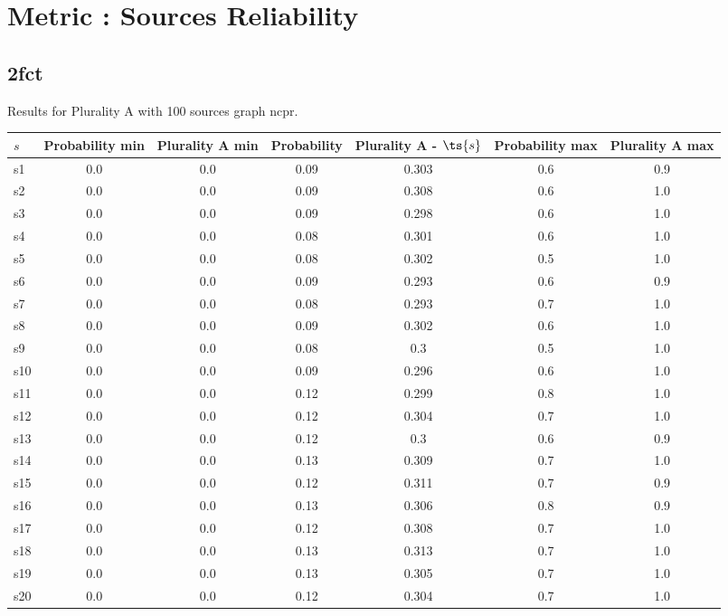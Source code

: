 \documentclass{article}
\begin{document}
\section{Metric : Sources Reliability}

\newpage
\newpage

\subsection{2fct}

\noindent Results for Plurality A with 100 sources graph ncpr.

\noindent\begin{tabular}{|l|c|c|c|c|c|c|}
\hline
$s$& Probability min & Plurality A min & Probability & Plurality A - $\ts{s}$ & Probability max & Plurality A max\\
\hline
s1 &0.0 & 0.0 & 0.09 & 0.303 & 0.6 & 0.9\\
\hline
s2 &0.0 & 0.0 & 0.09 & 0.308 & 0.6 & 1.0\\
\hline
s3 &0.0 & 0.0 & 0.09 & 0.298 & 0.6 & 1.0\\
\hline
s4 &0.0 & 0.0 & 0.08 & 0.301 & 0.6 & 1.0\\
\hline
s5 &0.0 & 0.0 & 0.08 & 0.302 & 0.5 & 1.0\\
\hline
s6 &0.0 & 0.0 & 0.09 & 0.293 & 0.6 & 0.9\\
\hline
s7 &0.0 & 0.0 & 0.08 & 0.293 & 0.7 & 1.0\\
\hline
s8 &0.0 & 0.0 & 0.09 & 0.302 & 0.6 & 1.0\\
\hline
s9 &0.0 & 0.0 & 0.08 & 0.3 & 0.5 & 1.0\\
\hline
s10 &0.0 & 0.0 & 0.09 & 0.296 & 0.6 & 1.0\\
\hline
s11 &0.0 & 0.0 & 0.12 & 0.299 & 0.8 & 1.0\\
\hline
s12 &0.0 & 0.0 & 0.12 & 0.304 & 0.7 & 1.0\\
\hline
s13 &0.0 & 0.0 & 0.12 & 0.3 & 0.6 & 0.9\\
\hline
s14 &0.0 & 0.0 & 0.13 & 0.309 & 0.7 & 1.0\\
\hline
s15 &0.0 & 0.0 & 0.12 & 0.311 & 0.7 & 0.9\\
\hline
s16 &0.0 & 0.0 & 0.13 & 0.306 & 0.8 & 0.9\\
\hline
s17 &0.0 & 0.0 & 0.12 & 0.308 & 0.7 & 1.0\\
\hline
s18 &0.0 & 0.0 & 0.13 & 0.313 & 0.7 & 1.0\\
\hline
s19 &0.0 & 0.0 & 0.13 & 0.305 & 0.7 & 1.0\\
\hline
s20 &0.0 & 0.0 & 0.12 & 0.304 & 0.7 & 1.0\\

\end{tabular}
\end{document}
